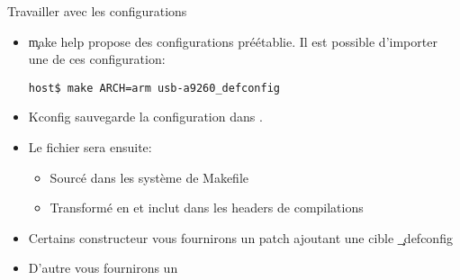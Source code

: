 \begin{frame}[fragile=singleslide]{Travailler avec les configurations}
  \begin{itemize} 
  \item \c{make  help} propose des configurations  préétablie. Il est
    possible d'importer une de ces configuration:
    \begin{lstlisting} 
host$ make ARCH=arm usb-a9260_defconfig
    \end{lstlisting} 
  \item Kconfig sauvegarde la configuration dans . 
  \item Le fichier  sera ensuite:
    \begin{itemize} 
    \item Sourcé dans les système de Makefile
    \item Transformé  en  et inclut
      dans les headers de compilations
    \end{itemize} 
  \item Certains  constructeur vous  fournirons un patch  ajoutant une
    cible \c{_defconfig}
  \item D'autre vous fournirons un 
\end{itemize} 
\end{frame} 

